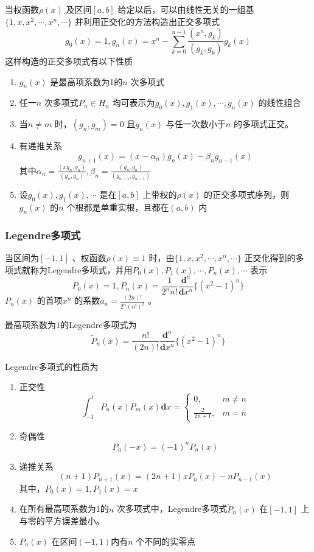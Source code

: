\documentclass[a4paper]{article}
\begin{document}
当权函数$\rho(x)$ 及区间$[a,b]$ 给定以后，可以由线性无关的一组基$\{1, x, x^2, \cdots, x^{n}, \cdots\} $ 并利用正交化的方法构造出正交多项式
\[
g_0(x) = 1, g_n(x) = x^{n} - \sum_{k=0}^{n-1} \frac{(x^{n}, g_k)}{(g_k, g_k)} g_k(x)
\] 
这样构造的正交多项式有以下性质
\begin{enumerate}
	\item $g_n(x)$ 是最高项系数为1的$n$ 次多项式
	\item 任一$n$ 次多项式$P_n \in H_n$ 均可表示为$g_0(x), g_1(x), \cdots, g_n(x)$ 的线性组合
	\item 当$n \neq m$ 时，$(g_n, g_m) = 0$ 且$g_n(x)$ 与任一次数小于$n$ 的多项式正交。
	\item 有递推关系
		\[
			g_{n+1}(x) = (x - \alpha_n) g_n(x) - \beta_n g_{n-1}(x)
		\] 
		其中$\alpha_n = \frac{(xg_n,g_n)}{(g_n,g_n)}, \beta_n = \frac{(g_n,g_n)}{(g_{n-1},g_{n-1})}$
	\item 设$g_0(x), g_1(x), \cdots$ 是在$[a,b]$ 上带权的$\rho(x)$ 的正交多项式序列，则$g_n(x)$ 的$n$ 个根都是单重实根，且都在$(a,b)$ 内
\end{enumerate}

\subsubsection{Legendre多项式}
当区间为$[-1,1]$ 、权函数$\rho(x) \equiv 1$ 时，由$\{1, x, x^2, \cdots, x^{n}, \cdots\} $ 正交化得到的多项式就称为Legendre多项式，并用$P_0(x), P_1(x), \cdots, P_n(x), \cdots$ 表示
\[
	P_0(x) = 1, P_n(x) = \frac{1}{2^{n}n!} \frac{\mathbf{d}^{n}}{\mathbf{d}x^{n}} \{(x^2 - 1)^{n}\} 
\] 
$P_n(x)$ 的首项$x^{n}$ 的系数$a_n = \frac{(2n)!}{2^{n}(n!)^2}$ 。

最高项系数为1的Legendre多项式为
\[
\tilde{P}_n(x) = \frac{n!}{(2n)!} \frac{\mathbf{d}^{n}}{\mathbf{d}x^{n}} \{(x^2 - 1)^{n}\}
\] 

Legendre多项式的性质为
\begin{enumerate}
	\item 正交性
		\[
		\int_{-1}^{1} P_n(x) P_m(x) \mathbf{d} x = 
		\begin{cases}
			0, & m \neq n \\
			\frac{2}{2n+1}, & m=n
		\end{cases}
		\] 
	\item 奇偶性
		\[
		P_n(-x) = (-1)^{n} P_n(x)
		\] 
	\item 递推关系
		\[
			(n+1)P_{n+1}(x) = (2n+1)x P_n(x) - n P_{n-1}(x)
		\] 
		其中，$P_0(x) = 1, P_1(x) = x$
	\item 在所有最高项系数为1的$n$ 次多项式中，Legendre多项式$\tilde{P}_n(x)$ 在$[-1,1]$ 上与零的平方误差最小。
	\item $P_n(x)$ 在区间$(-1,1)$内有$n$ 个不同的实零点
\end{enumerate}
\end{document}
